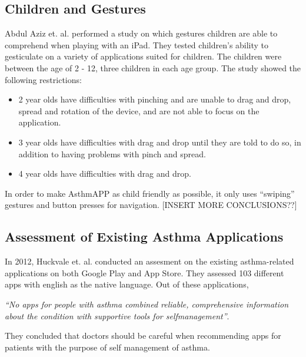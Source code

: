 \subsection{Children and Gestures}
\label{sec:childrenandgestures}
Abdul Aziz et. al.\cite{aziz2013children} performed a study on which gestures children are able to comprehend when playing with an iPad. They tested children's ability to gesticulate on a variety of applications suited for children. The children were between the age of 2 - 12, three children in each age group. The study showed the following restrictions:

\begin{itemize}
  \item 2 year olds have difficulties with pinching and are unable to drag and drop, spread and rotation of the device, and are not able to focus on the application. 
  \item 3 year olds have difficulties with drag and drop until they are told to do so, in addition to having problems with pinch and spread. 
  \item 4 year olds have difficulties with drag and drop. 
\end{itemize}

In order to make AsthmAPP as child friendly as possible, it only uses ``swiping'' gestures and button presses for navigation.
[INSERT MORE CONCLUSIONS??]


\subsection{Assessment of Existing Asthma Applications}
In 2012, Huckvale et. al.\cite{huckvale2012apps} conducted an assesment on the existing asthma-related applications on both Google Play and App Store. They assessed 103 different apps with english as the native language. Out of these applications, 

\emph{``No apps for people with asthma combined reliable, comprehensive information about the condition with supportive tools for self­management''}\cite{huckvale2012apps}. 

They concluded that doctors should be careful when recommending apps for patients with the purpose of self management of asthma.